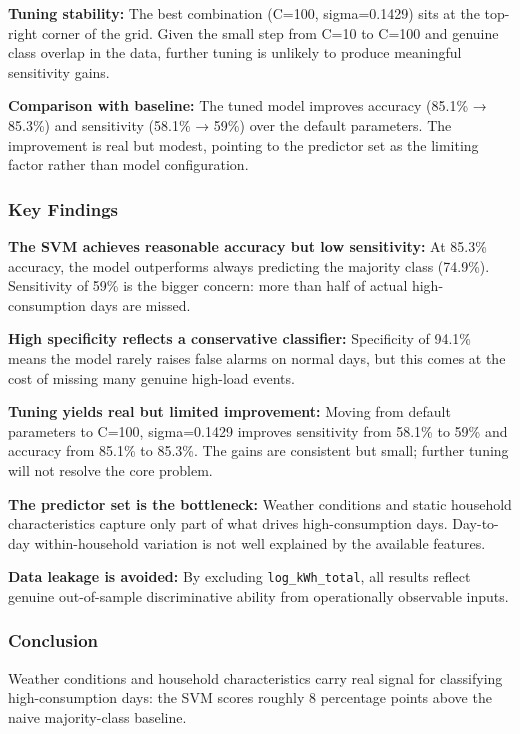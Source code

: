 \documentclass[
]{article}
\begin{document}
\textbf{Tuning stability:} The best combination (C=100, sigma=0.1429)
sits at the top-right corner of the grid. Given the small step from C=10
to C=100 and genuine class overlap in the data, further tuning is
unlikely to produce meaningful sensitivity gains.

\textbf{Comparison with baseline:} The tuned model improves accuracy
(85.1\% → 85.3\%) and sensitivity (58.1\% → 59\%) over the default
parameters. The improvement is real but modest, pointing to the
predictor set as the limiting factor rather than model configuration.

\subsubsection{Key Findings}\label{key-findings-4}

\textbf{The SVM achieves reasonable accuracy but low sensitivity:} At
85.3\% accuracy, the model outperforms always predicting the majority
class (74.9\%). Sensitivity of 59\% is the bigger concern: more than
half of actual high-consumption days are missed.

\textbf{High specificity reflects a conservative classifier:}
Specificity of 94.1\% means the model rarely raises false alarms on
normal days, but this comes at the cost of missing many genuine
high-load events.

\textbf{Tuning yields real but limited improvement:} Moving from default
parameters to C=100, sigma=0.1429 improves sensitivity from 58.1\% to
59\% and accuracy from 85.1\% to 85.3\%. The gains are consistent but
small; further tuning will not resolve the core problem.

\textbf{The predictor set is the bottleneck:} Weather conditions and
static household characteristics capture only part of what drives
high-consumption days. Day-to-day within-household variation is not well
explained by the available features.

\textbf{Data leakage is avoided:} By excluding \texttt{log\_kWh\_total},
all results reflect genuine out-of-sample discriminative ability from
operationally observable inputs.

\subsubsection{Conclusion}\label{conclusion-5}

Weather conditions and household characteristics carry real signal for
classifying high-consumption days: the SVM scores roughly 8 percentage
points above the naive majority-class baseline.
\end{document}
